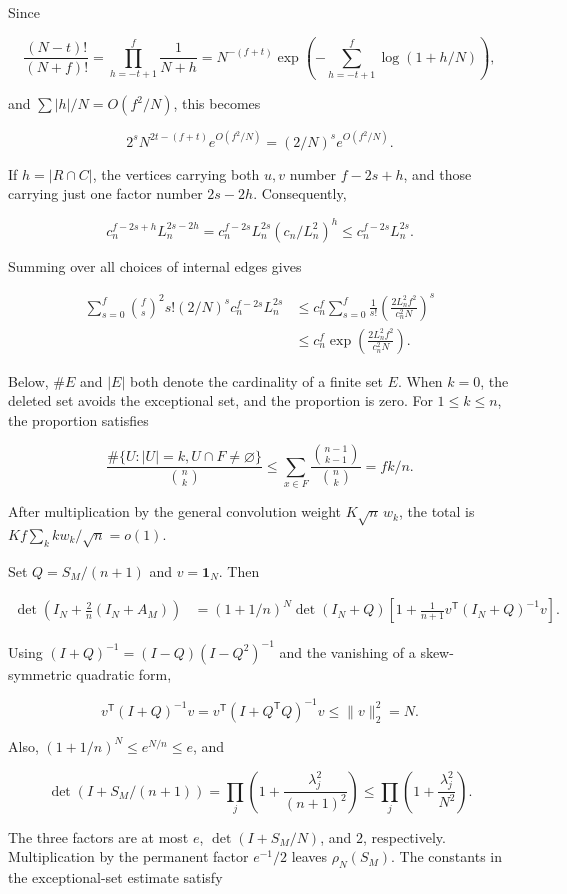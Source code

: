 \documentclass[11pt,a4paper]{article}
\begin{document}
Since

\[
\frac{(N-t)!}{(N+f)!}=\prod_{h=-t+1}^{f}\frac1{N+h}
=N^{-(f+t)}\exp\left(-\sum_{h=-t+1}^{f}\log(1+h/N)\right),
\]

and \(\sum|h|/N=O(f^2/N)\), this becomes

\[
2^sN^{2t-(f+t)}e^{O(f^2/N)}=(2/N)^se^{O(f^2/N)}.
\]

If \(h=|R\cap C|\), the vertices carrying both \(u,v\) number \(f-2s+h\), and those carrying just one factor number \(2s-2h\). Consequently,

\[
c_n^{f-2s+h}L_n^{2s-2h}
=c_n^{f-2s}L_n^{2s}(c_n/L_n^2)^h
\le c_n^{f-2s}L_n^{2s}.
\]

Summing over all choices of internal edges gives

\[
\begin{aligned}
\sum_{s=0}^f\binom fs^2s!(2/N)^sc_n^{f-2s}L_n^{2s}
&\le c_n^f\sum_{s=0}^f\frac1{s!}
\left(\frac{2L_n^2f^2}{c_n^2N}\right)^s\\
&\le c_n^f\exp\left(\frac{2L_n^2f^2}{c_n^2N}\right).
\end{aligned}
\]

Below, \(\#E\) and \(|E|\) both denote the cardinality of a finite set \(E\). When \(k=0\), the deleted set avoids the exceptional set, and the proportion is zero. For \(1\le k\le n\), the proportion satisfies

\[
\frac{\#\{U:|U|=k,U\cap F\ne\varnothing\}}{\binom nk}
\le\sum_{x\in F}\frac{\binom{n-1}{k-1}}{\binom nk}=fk/n.
\]

After multiplication by the general convolution weight \(K\sqrt n\,w_k\), the total is \(Kf\sum_kkw_k/\sqrt n=o(1)\).

Set \(Q=S_M/(n+1)\) and \(v=\mathbf1_N\). Then

\[
\begin{aligned}
\det\left(I_N+\frac2n(I_N+A_M)\right)
&=(1+1/n)^N\det(I_N+Q)
\left[1+\frac1{n+1}v^{\mathsf T}(I_N+Q)^{-1}v\right].
\end{aligned}
\]

Using \((I+Q)^{-1}=(I-Q)(I-Q^2)^{-1}\) and the vanishing of a skew-symmetric quadratic form,

\[
v^{\mathsf T}(I+Q)^{-1}v=v^{\mathsf T}(I+Q^{\mathsf T}Q)^{-1}v\le\|v\|_2^2=N.
\]

Also, \((1+1/n)^N\le e^{N/n}\le e\), and

\[
\det(I+S_M/(n+1))=\prod_j\left(1+\frac{\lambda_j^2}{(n+1)^2}\right)
\le\prod_j\left(1+\frac{\lambda_j^2}{N^2}\right).
\]

The three factors are at most \(e\), \(\det(I+S_M/N)\), and \(2\), respectively. Multiplication by the permanent factor \(e^{-1}/2\) leaves \(\rho_N(S_M)\). The constants in the exceptional-set estimate satisfy
\end{document}
